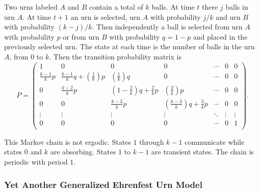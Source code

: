 \documentclass[12pt]{article}
\begin{document}
Two urns labeled \( A \) and \( B \) contain a total of \( k \) balls.
At time \( t \) there \( j \) balls in urn \( A \).  At time \( t + 1 \)
an urn is selected, urn \( A \) with probability \( j/k \) and urn \( B \)
with probability \( (k-j)/k \).  Then independently a ball is selected
from urn \( A \) with probability \( p \) or from urn \( B \) with
probability \( q = 1-p \) and placed in the previously selected urn.
The state at each time is the number of balls in the urn \( A \), from \(
0 \) to \( k \).  Then the transition probability matrix is
\[
    P =
    \begin{pmatrix}
        1 & 0 & 0 & 0 & \cdots & 0 & 0 \\
        \frac{k-1}{k} p & \frac{k-1}{k} q + \left( \frac{1}{k} \right) p
        & \left( \frac{1}{k} \right) q & 0 & \cdots & 0 & 0 \\
        0 & \frac{k-2}{k} p & \left( 1-\frac{2}{k}\right) q + \frac{2}{k}
        p & \left( \frac{2}{k} \right) p & \cdots & 0 & 0 \\
        0 & 0 & \frac{k-3}{k} p & \left( \frac{k-3}{k}\right) q + \frac{3}
        {k} p & \cdots & 0 & 0 \\
        \vdots & \vdots & \vdots & \vdots & \ddots & \vdots & \vdots \\
        0 & 0 & 0 & 0 & \cdots & 0 & 1 \\
    \end{pmatrix}
    .
\]

This Markov chain is not ergodic.  States \( 1 \) through \( k-1 \)
communicate while states \( 0 \) and \( k \) are absorbing.  States \( 1
\) to \( k-1 \) are transient states.  The chain is periodic with period
\( 1 \).

\subsubsection*{Yet Another Generalized Ehrenfest Urn Model}
\end{document}
